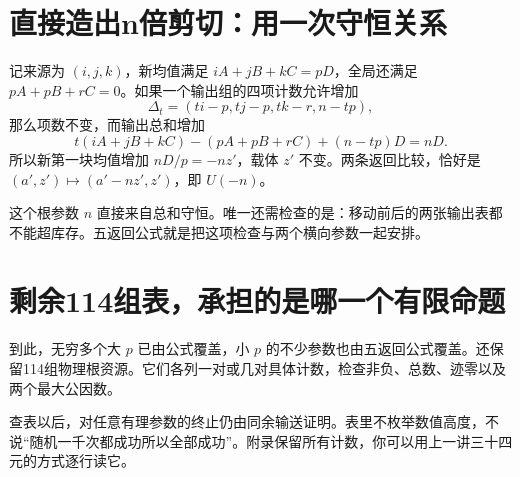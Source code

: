 \section{直接造出n倍剪切：用一次守恒关系}
记来源为 $(i,j,k)$，新均值满足 $iA+jB+kC=pD$，全局还满足 $pA+pB+rC=0$。如果一个输出组的四项计数允许增加
\[\Delta_t=(ti-p, tj-p, tk-r, n-tp),
\]
那么项数不变，而输出总和增加
\[
t(iA+jB+kC)-(pA+pB+rC)+(n-tp)D=nD.
\]
所以新第一块均值增加 $nD/p=-nz'$，载体 $z'$ 不变。两条返回比较，恰好是 $(a',z')\mapsto(a'-nz',z')$，即 $U(-n)$。

这个根参数 $n$ 直接来自总和守恒。唯一还需检查的是：移动前后的两张输出表都不能超库存。五返回公式就是把这项检查与两个横向参数一起安排。

\section{剩余114组表，承担的是哪一个有限命题}
到此，无穷多个大 $p$ 已由公式覆盖，小 $p$ 的不少参数也由五返回公式覆盖。还保留114组物理根资源。它们各列一对或几对具体计数，检查非负、总数、迹零以及两个最大公因数。

查表以后，对任意有理参数的终止仍由同余输送证明。表里不枚举数值高度，不说“随机一千次都成功所以全部成功”。附录保留所有计数，你可以用上一讲三十四元的方式逐行读它。
